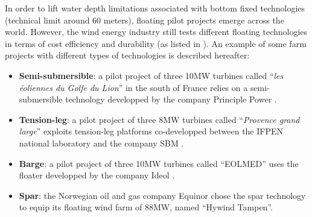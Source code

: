In order to lift water depth limitations associated with bottom fixed technologies (technical limit around 60 meters), floating pilot projects emerge across the world. 
However, the wind energy industry still tests different floating technologies in terms of cost efficiency and durability (as listed in \citealt{mackinnon_2022_FOWT_table}). 
An example of some farm projects with different types of technologies is described hereafter: 
\begin{itemize}
    \item \textbf{Semi-submersible}: a pilot project of three 10MW turbines called ``\textit{les éoliennes du Golfe du Lion}'' in the south of France relies on a semi-submersible technology developped by the company Principle Power \citep{cermelli_2018_windfloat}.   
    \item \textbf{Tension-leg}: a pilot project of three 8MW turbines called ``\textit{Provence grand large}'' exploits tension-leg platforms co-developped between the IFPEN national laboratory and the company SBM \citep{caille_2017_TPL_IFPEN}. 
    \item \textbf{Barge}: a pilot project of three 10MW turbines called ``EOLMED'' uses the floater developped by the company Ideol \citep{guignier_2016_ideol}. 
    \item \textbf{Spar}: the Norwegian oil and gas company Equinor chose the spar technology \citep{driscoll_2016_hywind} to equip its floating wind farm of 88MW, named ``Hywind Tampen''. 
\end{itemize}

